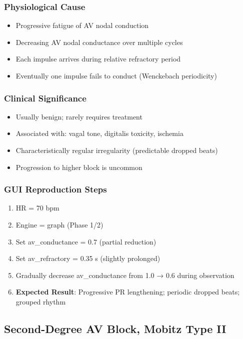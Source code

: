 \documentclass[11pt, a4paper]{article}
\begin{document}
\subsubsection{Physiological Cause}
\begin{itemize}
    \item Progressive fatigue of AV nodal conduction
    \item Decreasing AV nodal conductance over multiple cycles
    \item Each impulse arrives during relative refractory period
    \item Eventually one impulse fails to conduct (Wenckebach periodicity)
\end{itemize}

\subsubsection{Clinical Significance}
\begin{itemize}
    \item Usually benign; rarely requires treatment
    \item Associated with: vagal tone, digitalis toxicity, ischemia
    \item Characteristically regular irregularity (predictable dropped beats)
    \item Progression to higher block is uncommon
\end{itemize}

\subsubsection{GUI Reproduction Steps}
\begin{enumerate}
    \item HR = 70 bpm
    \item Engine = graph (Phase 1/2)
    \item Set av\_conductance = 0.7 (partial reduction)
    \item Set av\_refractory = 0.35 s (slightly prolonged)
    \item Gradually decrease av\_conductance from 1.0 → 0.6 during observation
    \item \textbf{Expected Result}: Progressive PR lengthening; periodic dropped beats; grouped rhythm
\end{enumerate}

\subsection{Second-Degree AV Block, Mobitz Type II}
\end{document}
